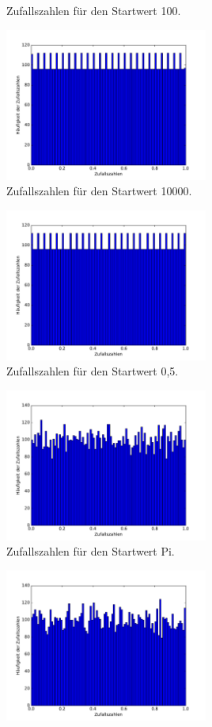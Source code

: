\begin{figure}[H]
\begin{subfigure}{0.48\textwidth}
        \caption{Zufallszahlen für den Startwert 100.}
      \end{subfigure}
      \begin{subfigure}{0.48\textwidth}
        \centering
        \includegraphics[height=5cm]{Histogrammb6.pdf}
        \caption{Zufallszahlen für den Startwert 10000.}
      \end{subfigure}
      \centering
      \begin{subfigure}{0.48\textwidth}
        \centering
        \includegraphics[height=5cm]{Histogrammb7.pdf}
        \caption{Zufallszahlen für den Startwert 0,5.}
      \end{subfigure}
      \begin{subfigure}{0.48\textwidth}
        \centering
        \includegraphics[height=5cm]{Histogrammb8.pdf}
        \caption{Zufallszahlen für den Startwert Pi.}
      \end{subfigure}
      \begin{subfigure}{0.48\textwidth}
        \centering
        \includegraphics[height=5cm]{Histogrammb9.pdf}

\end{subfigure}
\end{figure}
